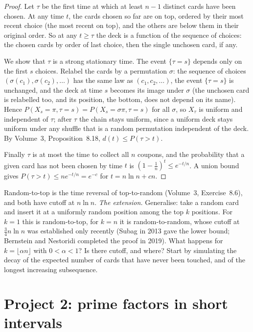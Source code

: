 \begin{proof}
Let $\tau$ be the first time at which at least $n-1$ distinct cards have been chosen. At any time $t$, the cards chosen so far are on top, ordered by their most recent choice (the most recent on top), and the others are below them in their original order. So at any $t\ge\tau$ the deck is a function of the sequence of choices: the chosen cards by order of last choice, then the single unchosen card, if any.

We show that $\tau$ is a strong stationary time. The event $\{\tau=s\}$ depends only on the first $s$ choices. Relabel the cards by a permutation $\sigma$: the sequence of choices $(\sigma(c_1),\sigma(c_2),\dots)$ has the same law as $(c_1,c_2,\dots)$, the event $\{\tau=s\}$ is unchanged, and the deck at time $s$ becomes its image under $\sigma$ (the unchosen card is relabelled too, and its position, the bottom, does not depend on its name). Hence $P(X_s=\pi,\tau=s)=P(X_s=\sigma\pi,\tau=s)$ for all $\sigma$, so $X_\tau$ is uniform and independent of $\tau$; after $\tau$ the chain stays uniform, since a uniform deck stays uniform under any shuffle that is a random permutation independent of the deck. By Volume~3, Proposition~8.18, $d(t)\le P(\tau>t)$.

Finally $\tau$ is at most the time to collect all $n$ coupons, and the probability that a given card has not been chosen by time $t$ is $(1-\frac1n)^t\le e^{-t/n}$. A union bound gives $P(\tau>t)\le ne^{-t/n}=e^{-c}$ for $t=n\ln n+cn$.
\end{proof}

Random-to-top is the time reversal of top-to-random (Volume~3, Exercise~8.6), and both have cutoff at $n\ln n$. \emph{The extension.} Generalise: take a random card and insert it at a uniformly random position among the top $k$ positions. For $k=1$ this is random-to-top, for $k=n$ it is random-to-random, whose cutoff at $\frac34n\ln n$ was established only recently (Subag in 2013 gave the lower bound; Bernstein and Nestoridi completed the proof in 2019). What happens for $k=\lfloor\alpha n\rfloor$ with $0<\alpha<1$? Is there cutoff, and where? Start by simulating the decay of the expected number of cards that have never been touched, and of the longest increasing subsequence.

\section{Project 2: prime factors in short intervals}

